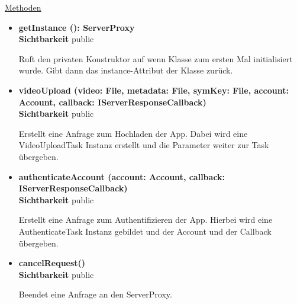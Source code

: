 \underline{Methoden}
\begin{itemize}
\itemsep0pt

\item \textbf{getInstance (): ServerProxy}\hfill\\
\textbf{Sichtbarkeit} public

Ruft den privaten Konstruktor auf wenn Klasse zum ersten Mal initialisiert wurde. Gibt dann das instance-Attribut der Klasse zurück.

\item \textbf{videoUpload (video: File, metadata: File, symKey: File, account: Account, callback: IServerResponseCallback)}\hfill\\
\textbf{Sichtbarkeit} public

Erstellt eine Anfrage zum Hochladen der App. Dabei wird eine VideoUploadTask Instanz erstellt und die Parameter weiter zur  Task übergeben.

\item \textbf{authenticateAccount (account: Account, callback: IServerResponseCallback)}\hfill\\
\textbf{Sichtbarkeit} public

Erstellt eine Anfrage zum Authentifizieren der App. Hierbei wird eine AuthenticateTask Instanz gebildet und der Account und der Callback übergeben.

\item \textbf{cancelRequest()}\hfill\\
\textbf{Sichtbarkeit} public

Beendet eine Anfrage an den ServerProxy.

\end{itemize}